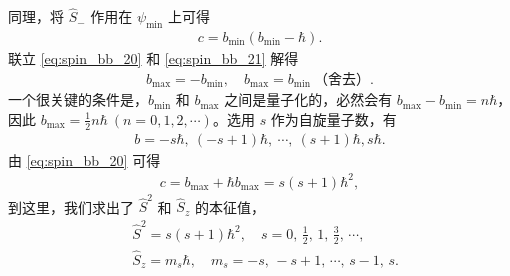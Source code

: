 同理，将 $\hat S_-$ 作用在 $\psi_\text{min}$ 上可得
\begin{align}
    c = b_\text{min} (b_\text{min} - \hbar). 
    \label{eq:spin_bb_21}
\end{align}
联立 \eqref{eq:spin_bb_20} 和 \eqref{eq:spin_bb_21} 解得
\begin{align}
    b_\text{max} = -b_\text{min}, \quad b_\text{max} = b_\text{min} \ \text{（舍去）}. 
\end{align}
一个很关键的条件是，$b_\text{min}$ 和 $b_\text{max}$ 之间是量子化的，必然会有 $b_\text{max} - b_\text{min} = n\hbar$，因此 $b_\text{max} = \frac12 n\hbar \ (n=0,1,2,\cdots)$。选用 $s$ 作为自旋量子数，有
\begin{align}
    b = -s\hbar,\ (-s+1)\hbar, \ \cdots, \ (s+1)\hbar, s\hbar. 
\end{align}
由 \eqref{eq:spin_bb_20} 可得
\begin{align}
    c = b_\text{max} + \hbar b_\text{max} = s(s+1) \hbar^2, 
\end{align}
到这里，我们求出了 $\hat S^2$ 和 $\hat S_z$ 的本征值，
\begin{align}
&\hat S^2  = s(s+1)\hbar^2 , \quad s = 0,\, \frac12,\, 1,\, \frac32,\, \cdots, \\
&\hat S_z  = m_s \hbar , \quad m_s = -s,\, -s+1,\, \cdots,\, s-1,\, s. 
\end{align}


